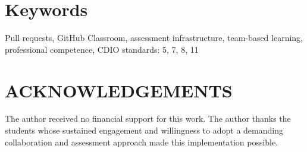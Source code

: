 \documentclass[11pt]{cdio}
\begin{document}
\section{Keywords}
Pull requests, GitHub Classroom, assessment infrastructure, team-based learning, professional competence, CDIO standards: 5, 7, 8, 11


\newpage{}%



\section{ACKNOWLEDGEMENTS}
The author received no financial support for this work. The author thanks the students whose sustained engagement and willingness to adopt a demanding collaboration and assessment approach made this implementation possible.

\setlength\bibitemsep{2pt}%

\printbibliography{}
\end{document}
